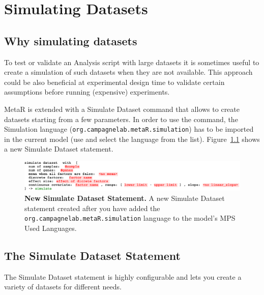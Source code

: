 

\chapter{Simulating Datasets}\label{chap:SimulatingDatasets}

\section{Why simulating datasets}

To test or validate an Analysis script with large datasets it is sometimes useful to create a simulation of such datasets when they are not available. This approach could be also beneficial at experimental design time to validate certain assumptions before running (expensive) experiments.

MetaR is extended with a Simulate Dataset command that allows to create datasets starting from a few parameters. In order to use the command, the Simulation language (\texttt{org.campagnelab.metaR.simulation}) has to be imported in the current model (use  and select the language from the list). Figure~\ref{fig:NewSimulateStatement} shows a new Simulate Dataset statement.

\begin{figure}[h!tbp]
  \centering
  \includegraphics[width=\figWidthWide]{figures/NewSimulateStatement.pdf}
\caption[New Simulate Dataset Statement.]{\textbf{New Simulate Dataset Statement.} A new Simulate Dataset statement created after you have added the \texttt{org.campagnelab.metaR.simulation} language to the model's MPS Used Languages.}
\label{fig:NewSimulateStatement}
\end{figure}
 

\section{The Simulate Dataset Statement}
The Simulate Dataset statement is highly configurable and lets you create a variety of datasets for different needs.  

